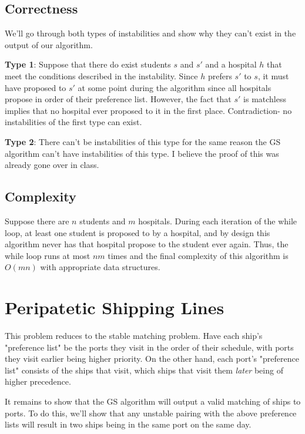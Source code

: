 \documentclass[12pt]{article}
\begin{document}
\subsection*{Correctness}

We'll go through both types of instabilities and show why they can't exist
in the output of our algorithm.

\textbf{Type 1}:
Suppose that there do exist students $s$ and $s'$ and a hospital $h$
that meet the conditions described in the instability.
Since $h$ prefers $s'$ to $s$, it must have proposed to $s'$ at some point
during the algorithm since all hospitals propose in order of their preference list.
However, the fact that $s'$ is matchless implies that no hospital
ever proposed to it in the first place.
Contradiction- no instabilities of the first type can exist.

\textbf{Type 2}:
There can't be instabilities of this type for the same reason
the GS algorithm can't have instabilities of this type.
I believe the proof of this was already gone over in class.

\subsection*{Complexity}

Suppose there are $n$ students and $m$ hospitals.
During each iteration of the while loop, at least one student is proposed to
by a hospital, and by design this algorithm never has that hospital propose
to the student ever again.
Thus, the while loop runs at most $nm$ times and the final complexity
of this algorithm is $O(mn)$ with appropriate data structures.

\section{Peripatetic Shipping Lines}

This problem reduces to the stable matching problem.
Have each ship's "preference list" be the ports they visit in the order of their schedule,
with ports they visit earlier being higher priority.
On the other hand, each port's "preference list" consists of the ships that visit,
which ships that visit them \textit{later} being of higher precedence.

It remains to show that the GS algorithm will output a valid matching of
ships to ports.
To do this, we'll show that any unstable pairing with the above preference
lists will result in two ships being in the same port on the same day.
\end{document}
